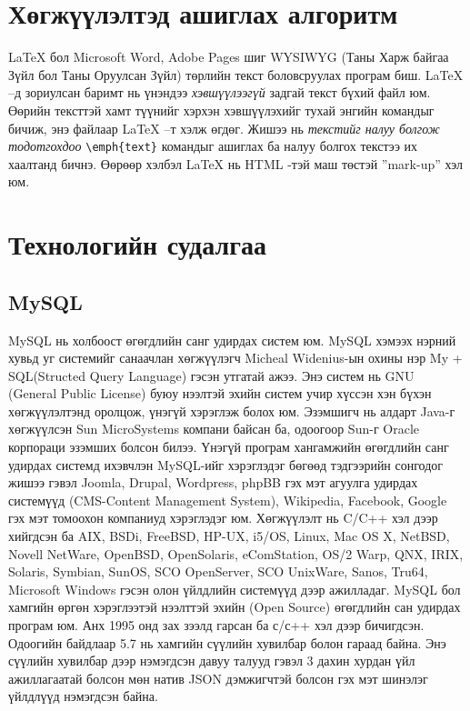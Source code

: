 
\section{Хөгжүүлэлтэд ашиглах алгоритм}

\LaTeX{} бол Microsoft Word, Adobe Pages шиг \textsc{WYSIWYG} (Таны Харж байгаа Зүйл бол Таны Оруулсан Зүйл) төрлийн текст боловсруулах програм биш. \LaTeX{} --д зориулсан баримт нь үнэндээ \emph{хэвшүүлээгүй} задгай текст бүхий файл юм. Өөрийн тексттэй хамт түүнийг хэрхэн хэвшүүлэхийг тухай энгийн командыг бичиж, энэ файлаар \LaTeX{} --т хэлж өгдөг. Жишээ нь \emph{текстийг налуу болгож тодотгохдоо} \verb|\emph{text}| командыг ашиглах ба налуу болгох текстээ их хаалтанд бичнэ. Өөрөөр хэлбэл \LaTeX{} нь HTML -тэй маш төстэй ''{mark-up}'' хэл юм.


\section{Технологийн судалгаа}

	\subsection{MySQL}
	
	MySQL нь холбоост өгөгдлийн санг удирдах систем юм. MySQL хэмээх нэрний хувьд уг системийг санаачлан хөгжүүлэгч Micheal Widenius-ын охины нэр My + SQL(Structed Query Language) гэсэн утгатай ажээ.
	Энэ систем нь GNU (General Public License) буюу нээлтэй эхийн систем учир хүссэн хэн бүхэн хөгжүүлэлтэнд оролцож, үнэгүй хэрэглэж болох юм. Эзэмшигч нь алдарт Java-г хөгжүүлсэн Sun MicroSystems компани байсан ба, одоогоор Sun-г Oracle корпораци эзэмших болсон билээ.
	Үнэгүй програм хангамжийн өгөгдлийн санг удирдах системд ихэвчлэн MySQL-ийг хэрэглэдэг бөгөөд тэдгээрийн сонгодог жишээ гэвэл Joomla, Drupal, Wordpress, phpBB гэх мэт агуулга удирдах системүүд (CMS-Content Management System), Wikipedia, Facebook, Google гэх мэт томоохон компаниуд хэрэглэдэг юм.
	Хөгжүүлэлт нь C/C++ хэл дээр хийгдсэн ба AIX, BSDi, FreeBSD, HP-UX, i5/OS, Linux, Mac OS X, NetBSD, Novell NetWare, OpenBSD, OpenSolaris, eComStation, OS/2 Warp, QNX, IRIX, Solaris, Symbian, SunOS, SCO OpenServer, SCO UnixWare, Sanos, Tru64, Microsoft Windows гэсэн олон үйлдлийн системүүд дээр ажилладаг.
	MySQL бол хамгийн өргөн хэрэглээтэй нээлттэй эхийн (Open Source) өгөгдлийн сан удирдах програм юм. Анх 1995 онд зах зээлд гарсан ба с/с++ хэл дээр бичигдсэн. Одоогийн байдлаар 5.7 нь хамгийн сүүлийн хувилбар болон гараад байна. Энэ сүүлийн хувилбар дээр нэмэгдсэн давуу талууд гэвэл 3 дахин хурдан үйл ажиллагаатай болсон мөн натив JSON дэмжигчтэй болсон гэх мэт шинэлэг үйлдлүүд нэмэгдсэн байна.
	
